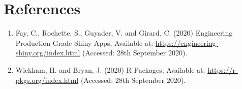 \documentclass[]{article}
\begin{document}
\hypertarget{references}{%
\section{\texorpdfstring{\textbf{References}}{References}}\label{references}}

\begin{enumerate}
\def\labelenumi{\arabic{enumi}.}
\item
  Fay, C., Rochette, S., Guyader, V. and Girard, C. (2020) Engineering
  Production-Grade Shiny Apps, Available at:
  \url{https://engineering-shiny.org/index.html} (Accessed: 28th
  September 2020).
\item
  Wickham, H. and Bryan, J. (2020) R Packages, Available at:
  \url{https://r-pkgs.org/index.html} (Accessed: 28th September 2020).
\end{enumerate}
\end{document}
